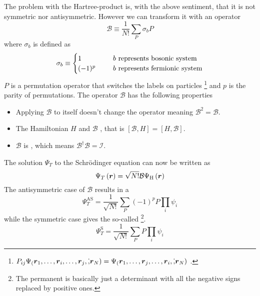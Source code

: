     The problem with the Hartree-product is, with the above sentiment, that it
    is not symmetric nor antisymmetric. However we can transform it with an
    operator
        \begin{equation}
            \mathcal{B} \equiv \frac{1}{N!}\sum_P\sigma_bP
        \end{equation}
    where $\sigma_b$ is defined as 
        \begin{equation}
            \sigma_b \equiv  
                \begin{cases}
                    1 \indent &\text{$b$ represents bosonic system} \\
                    (-1)^p \indent &\text{$b$ represents fermionic system}
                \end{cases}
        \end{equation}
    $P$ is a permutation operator that switches the labels on particles
    \footnote{$P_{ij}\Psi_(\boldsymbol{{r}}_1,\dots,\boldsymbol{{r}}_i,\dots,\boldsymbol{{r}}_j,\dot,\boldsymbol{{r}}_N)
    = \Psi_(\boldsymbol{{r}}_1,\dots,\boldsymbol{{r}}_j,\dots,\boldsymbol{{r}}_i,\dot,\boldsymbol{{r}}_N)$
    \cite{compphysThijssen}.} and $p$ is the parity of permutations. The
    operator $\mathcal{B}$ has the following properties
        \begin{itemize}
            \item Applying $\mathcal{B}$ to itself doesn't change the operator
                meaning $\mathcal{B}^2 = \mathcal{B}$.
            \item The Hamiltonian $H$ and $\mathcal{B}$ , that
                is $\left[\mathcal{B},H\right] = \left[H,\mathcal{B}\right]$.
            \item $\mathcal{B}$ is , which means
                $\mathcal{B}^{\dagger}\mathcal{B}=\mathcal{I}$.
        \end{itemize}
    The solution $\Psi_T$ to the Schrödinger equation can now be written as
        \begin{equation}
            \Psi_T\left(\boldsymbol{{r}}\right) =
            \sqrt{N!}\mathcal{B}\Psi_{\text{H}}\left(\boldsymbol{{r}}\right)
            \label{eq:psiOpB}
        \end{equation}
    The antisymmetric case of $\mathcal{B}$ results in a  
        \begin{equation}
            \Psi^{\text{AS}}_T = \frac{1}{\sqrt{N!}}\sum_{P}(-1)^pP\prod_i\psi_i
        \end{equation}
    while the symmetric case gives the so-called \footnote{The
    permanent is basically just a determinant with all the negative signs
    replaced by positive ones.}.
        \begin{equation}
            \Psi^{\text{S}}_T = \frac{1}{\sqrt{N!}}\sum_{P}P\prod_i\psi_i
        \end{equation}

